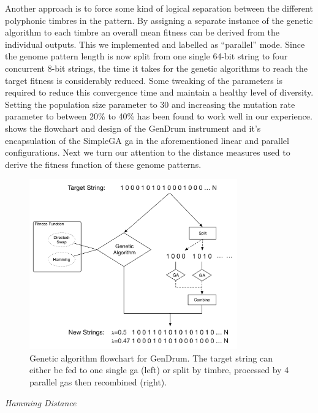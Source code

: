 Another approach is to force some kind of logical separation between the different polyphonic timbres in the pattern. By assigning a separate instance of the genetic algorithm to each timbre an overall mean fitness can be derived from the individual outputs. This we implemented and labelled as ``parallel'' mode. Since the genome pattern length is now split from one single 64-bit string to four concurrent 8-bit strings, the time it takes for the genetic algorithms to reach the target fitness is considerably reduced. Some tweaking of the parameters is required to reduce this convergence time and maintain a healthy level of diversity. Setting the population size parameter to 30 and increasing the mutation rate parameter to between 20\% to 40\% has been found to work well in our experience.  shows the flowchart and design of the GenDrum instrument and it's encapsulation of the SimpleGA \acrshort{ga} in the aforementioned linear and parallel configurations. Next we turn our attention to the distance measures used to derive the fitness function of these genome patterns.

\begin{figure}
	\begin{center}
		\includegraphics[width=0.8\textwidth]{ch03_symbolic/figures/ga_algorithm.png}
	\end{center}
	\caption[Genetic algorithm flowchart for GenDrum]{Genetic algorithm flowchart for GenDrum. The target string can either be fed to one single \acrshort{ga} (left) or split by timbre, processed by 4 parallel \acrshort{ga}s then recombined (right).}
	\label{fig:genetic}
\end{figure}

\textit{Hamming Distance}

